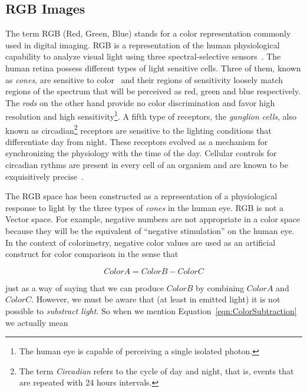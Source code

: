 %


\subsection{RGB Images}

The term RGB (Red, Green, Blue) stands for a color representation commonly used
in digital imaging. RGB is a representation of the human physiological
capability to analyze visual light using three spectral-selective
sensors~\cite{Malacara2002,Wyszecki2000}. The human retina possess different
types of light sensitive cells. Three of them, known as \emph{cones}, are
sensitive to color~\cite{Gray2003} and their regions of sensitivity loosely
match regions of the spectrum that will be perceived as red, green and blue
respectively. The \emph{rods} on the other hand provide no color discrimination
and favor high resolution and high sensitivity\footnote{The human eye is
capable of perceiving a single isolated photon.}.  A fifth type of receptors,
the \emph{ganglion cells}, also known as circadian\footnote{The term
\emph{Circadian} refers to the cycle of day and night, that is, events that are
repeated with 24 hours intervals.} receptors are sensitive to the lighting
conditions that differentiate day from night.  These receptors evolved as a
mechanism for synchronizing the physiology with the time of the day. Cellular
controls for circadian rythms are present in every cell of an organism and are
known to be exquisitively precise~\cite{Lodish2000}.

The RGB space has been constructed as a representation of a physiological
response to light by the three types of \emph{cones} in the human eye. RGB is
not a Vector space. For example, negative numbers are not appropriate in a
color space because they will be the equivalent of ``negative stimulation'' on
the human eye.  In the context of colorimetry, negative color values are used
as an artificial construct for color comparison in the sense that

\begin{equation}
\label{eqn:ColorSubtraction}
         ColorA = ColorB - ColorC
\end{equation}

just as a way of saying that we can produce $ColorB$ by combining $ColorA$ and
$ColorC$.  However, we must be aware that (at least in emitted light) it is not
possible to \emph{substract light}. So when we mention
Equation~\ref{eqn:ColorSubtraction} we actually mean


